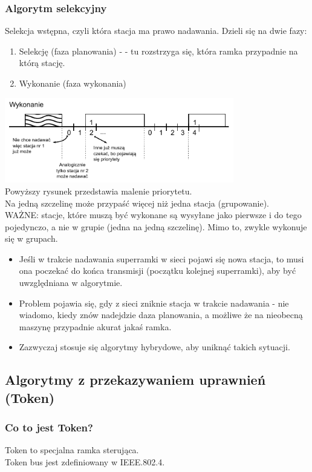 \documentclass[a4paper,twoside]{article}
\begin{document}
		\subsubsection{Algorytm selekcyjny}
			Selekcja wstępna, czyli która stacja ma prawo nadawania. Dzieli się na dwie fazy:
			\begin{enumerate}
				\item Selekcję (faza planowania) - - tu rozstrzyga się, która ramka przypadnie na którą stację.
				\item Wykonanie (faza wykonania)
			\end{enumerate}
			\includegraphics[width=10cm]{./images/image26.pdf}\\
			Powyższy rysunek przedstawia malenie priorytetu.\\
			Na jedną szczelinę może przypaść więcej niż jedna stacja (grupowanie).\\
			WAŻNE: stacje, które muszą być wykonane są wysyłane jako pierwsze i do tego pojedynczo, a nie w grupie (jedna na jedną szczelinę). Mimo to, zwykle wykonuje się w grupach.
			\begin{itemize}
				\item  Jeśli w trakcie nadawania superramki w sieci pojawi się nowa stacja, to musi ona poczekać do końca transmisji (początku kolejnej superramki), aby być uwzględniana w algorytmie.
				\item Problem pojawia się, gdy z sieci zniknie stacja w trakcie nadawania - nie wiadomo, kiedy znów nadejdzie daza planowania, a możliwe że na nieobecną maszynę przypadnie akurat jakaś ramka.
				\item Zazwyczaj stosuje się algorytmy hybrydowe, aby uniknąć takich sytuacji.
			\end{itemize}
	\subsection{Algorytmy z przekazywaniem uprawnień (Token)}
		\subsubsection{Co to jest Token?}
			Token to specjalna ramka sterująca.\\
			Token bus jest zdefiniowany w IEEE.802.4.
\end{document}
